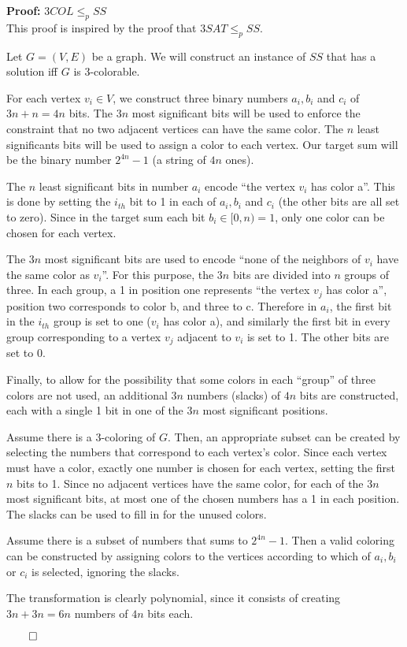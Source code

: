 \documentclass{amsart}
\begin{document}
\noindent
\textbf{Proof:} $3COL \le_p SS$\\

This proof is inspired by the proof that $3SAT \le_p SS$.

Let $G = (V, E)$ be a graph. We will construct an instance of $SS$ that has a solution iff $G$ is 3-colorable.

For each vertex $v_i \in V$, we construct three binary numbers $a_i, b_i$ and $c_i$ of $3n + n = 4n$ bits. The $3n$ most significant bits will be used to enforce the constraint that no two adjacent vertices can have the same color. The $n$ least significants bits will be used to assign a color to each vertex. Our target sum will be the binary number $2^{4n}-1$ (a string of $4n$ ones).

The $n$ least significant bits in number $a_i$ encode ``the vertex $v_i$ has color a''. This is done by setting the $i_{th}$ bit to 1 in each of $a_i, b_i$ and $c_i$ (the other bits are all set to zero). Since in the target sum each bit $b_i \in [0, n) = 1$, only one color can be chosen for each vertex.

The $3n$ most significant bits are used to encode ``none of the neighbors of $v_i$ have the same color as $v_i$''. For this purpose, the $3n$ bits are divided into $n$ groups of three. In each group, a 1 in position one represents ``the vertex $v_j$ has color a'', position two corresponds to color b, and three to c. Therefore in $a_i$, the first bit in the $i_{th}$ group is set to one ($v_i$ has color a), and similarly the first bit in every group corresponding to a vertex $v_j$ adjacent to $v_i$ is set to 1. The other bits are set to 0.

Finally, to allow for the possibility that some colors in each ``group'' of three colors are not used, an additional $3n$ numbers (slacks) of $4n$ bits are constructed, each with a single 1 bit in one of the $3n$ most significant positions.

Assume there is a 3-coloring of $G$. Then, an appropriate subset can be created by selecting the numbers that correspond to each vertex's color. Since each vertex must have a color, exactly one number is chosen for each vertex, setting the first $n$ bits to 1. Since no adjacent vertices have the same color, for each of the $3n$ most significant bits, at most one of the chosen numbers has a 1 in each position. The slacks can be used to fill in for the unused colors.

Assume there is a subset of numbers that sums to $2^{4n} - 1$. Then a valid coloring can be constructed by assigning colors to the vertices according to which of $a_i, b_i$ or $c_i$ is selected, ignoring the slacks.

The transformation is clearly polynomial, since it consists of creating $3n + 3n = 6n$ numbers of $4n$ bits each.

\hfill$\qed$
\end{document}
